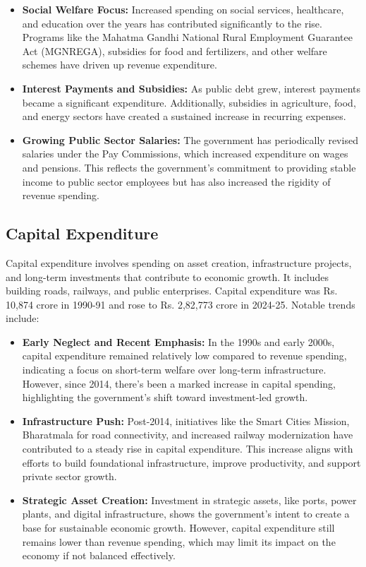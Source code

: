 \documentclass[a4paper,12pt]{extarticle} %
\begin{document}
\begin{itemize}
    \item \textbf{Social Welfare Focus:} Increased spending on social services, healthcare, and education over the years has contributed significantly to the rise. Programs like the Mahatma Gandhi National Rural Employment Guarantee Act (MGNREGA), subsidies for food and fertilizers, and other welfare schemes have driven up revenue expenditure.
    \item \textbf{Interest Payments and Subsidies:} As public debt grew, interest payments became a significant expenditure. Additionally, subsidies in agriculture, food, and energy sectors have created a sustained increase in recurring expenses.
    \item \textbf{Growing Public Sector Salaries:} The government has periodically revised salaries under the Pay Commissions, which increased expenditure on wages and pensions. This reflects the government’s commitment to providing stable income to public sector employees but has also increased the rigidity of revenue spending.
\end{itemize}

\subsection{Capital Expenditure}
Capital expenditure involves spending on asset creation, infrastructure projects, and long-term investments that contribute to economic growth. It includes building roads, railways, and public enterprises. Capital expenditure was Rs. 10,874 crore in 1990-91 and rose to Rs. 2,82,773 crore in 2024-25. Notable trends include:

\begin{itemize}
    \item \textbf{Early Neglect and Recent Emphasis:} In the 1990s and early 2000s, capital expenditure remained relatively low compared to revenue spending, indicating a focus on short-term welfare over long-term infrastructure. However, since 2014, there’s been a marked increase in capital spending, highlighting the government’s shift toward investment-led growth.
    \item \textbf{Infrastructure Push:} Post-2014, initiatives like the Smart Cities Mission, Bharatmala for road connectivity, and increased railway modernization have contributed to a steady rise in capital expenditure. This increase aligns with efforts to build foundational infrastructure, improve productivity, and support private sector growth.
    \item \textbf{Strategic Asset Creation:} Investment in strategic assets, like ports, power plants, and digital infrastructure, shows the government’s intent to create a base for sustainable economic growth. However, capital expenditure still remains lower than revenue spending, which may limit its impact on the economy if not balanced effectively.
\end{itemize}
\end{document}
